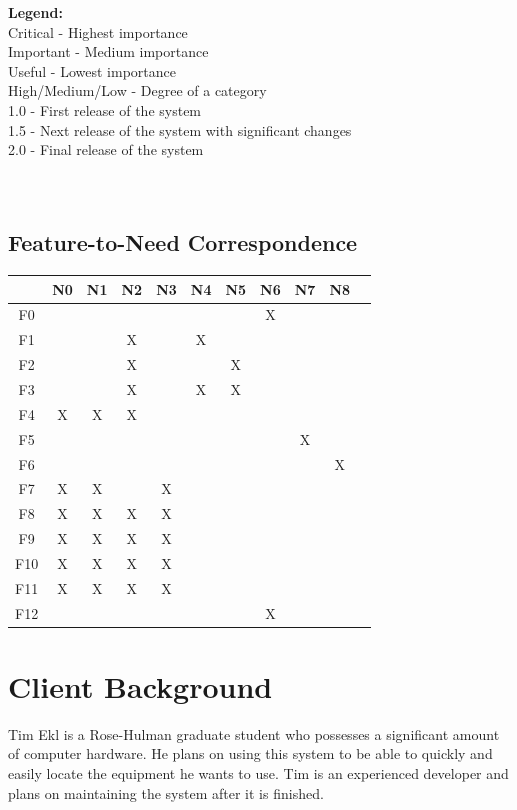 \documentclass{article}
\begin{document}
\textbf{Legend:} \\
Critical - Highest importance \\
Important - Medium importance \\
Useful - Lowest importance \\
High/Medium/Low - Degree of a category \\
1.0 - First release of the system \\
1.5 - Next release of the system with significant changes \\
2.0 - Final release of the system \\
~\\
~\\
\subsection{Feature-to-Need Correspondence}
\begin{tabular}{ | c || c | c | c | c | c | c | c | c | c | c | }
\hline
    & N0 & N1 & N2 & N3 & N4 & N5 & N6 & N7 & N8 \\
\hline
\hline
F0  &    &    &    &    &    &    & X  &    &    \\
\hline
F1  &    &    & X  &    & X  &    &    &    &    \\
\hline
F2  &    &    & X  &    &    & X  &    &    &    \\
\hline
F3  &    &    & X  &    & X  & X  &    &    &    \\
\hline
F4  & X  & X  & X  &    &    &    &    &    &    \\
\hline
F5  &    &    &    &    &    &    &    & X  &    \\
\hline
F6  &    &    &    &    &    &    &    &    & X  \\
\hline
F7  & X  & X  &    & X  &    &    &    &    &    \\
\hline
F8  & X  & X  & X  & X  &    &    &    &    &    \\
\hline
F9  & X  & X  & X  & X  &    &    &    &    &    \\
\hline
F10 & X  & X  & X  & X  &    &    &    &    &    \\
\hline
F11 & X  & X  & X  & X  &    &    &    &    &    \\
\hline
F12 &    &    &    &    &    &    & X  &    &    \\
\hline
\end{tabular}

\section{Client Background}
Tim Ekl is a Rose-Hulman graduate student who possesses a significant amount of computer hardware.  He plans on using this system to be able to quickly and easily locate the equipment he wants to use.  Tim is an experienced developer and plans on maintaining the system after it is finished.  
\end{document}
